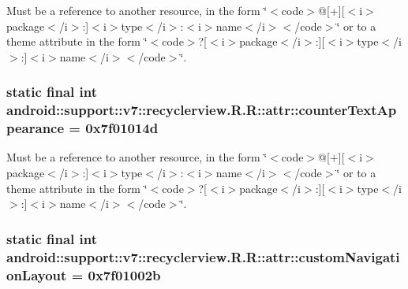 Must be a reference to another resource, in the form \char`\"{}$<$code$>$@\mbox{[}+\mbox{]}\mbox{[}$<$i$>$package$<$/i$>$:\mbox{]}$<$i$>$type$<$/i$>$:$<$i$>$name$<$/i$>$$<$/code$>$\char`\"{} or to a theme attribute in the form \char`\"{}$<$code$>$?\mbox{[}$<$i$>$package$<$/i$>$:\mbox{]}\mbox{[}$<$i$>$type$<$/i$>$:\mbox{]}$<$i$>$name$<$/i$>$$<$/code$>$\char`\"{}. \hypertarget{classandroid_1_1support_1_1v7_1_1recyclerview_1_1_r_1_1attr_d1ec770bfc8ef72c710ee2454970fe63}{
\subsubsection[{counterTextAppearance}]{\setlength{\rightskip}{0pt plus 5cm}static final int android::support::v7::recyclerview.R.R::attr::counterTextAppearance = 0x7f01014d}}
\label{classandroid_1_1support_1_1v7_1_1recyclerview_1_1_r_1_1attr_d1ec770bfc8ef72c710ee2454970fe63}


Must be a reference to another resource, in the form \char`\"{}$<$code$>$@\mbox{[}+\mbox{]}\mbox{[}$<$i$>$package$<$/i$>$:\mbox{]}$<$i$>$type$<$/i$>$:$<$i$>$name$<$/i$>$$<$/code$>$\char`\"{} or to a theme attribute in the form \char`\"{}$<$code$>$?\mbox{[}$<$i$>$package$<$/i$>$:\mbox{]}\mbox{[}$<$i$>$type$<$/i$>$:\mbox{]}$<$i$>$name$<$/i$>$$<$/code$>$\char`\"{}. \hypertarget{classandroid_1_1support_1_1v7_1_1recyclerview_1_1_r_1_1attr_57fff3065f8568cb707d7ce7777d2768}{
\subsubsection[{customNavigationLayout}]{\setlength{\rightskip}{0pt plus 5cm}static final int android::support::v7::recyclerview.R.R::attr::customNavigationLayout = 0x7f01002b}}
\label{classandroid_1_1support_1_1v7_1_1recyclerview_1_1_r_1_1attr_57fff3065f8568cb707d7ce7777d2768}


